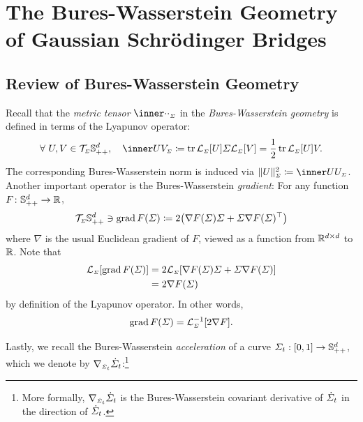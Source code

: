\section{The Bures-Wasserstein Geometry of Gaussian Schr\"odinger Bridges}
\label{app:mechanics}

\subsection{Review of Bures-Wasserstein Geometry}

\label{app:reviewBW}

Recall that the \emph{metric tensor} $\innerBW[\cdot][\cdot][\Sigma]$ in the \emph{Bures-Wasserstein geometry} \citep{takatsu2010wasserstein} is defined in terms of the Lyapunov operator: 
\begin{align}
\label{eq:BW-tensor}
\forall\ U, V\in \tspace, \quad \innerBW[U][V][\Sigma] \defeq \tr\lyap[\Sigma][U]\Sigma\lyap[\Sigma][V] = \frac{1}{2}\tr \lyap[\Sigma][U]V.
\end{align}The corresponding Bures-Wasserstein norm is induced via $\normBWsq[U][\Sigma] \defeq \innerBW[U][U][\Sigma]$.
Another important operator is the Bures-Wasserstein \emph{gradient}: For any function $F \colon \mathbb{S}_{++}^d \to \mathbb{R}$, 
\begin{equation}
\label{eq:gradBW-def}
\tspace\ni \gradBW F(\Sigma) \defeq 2 \parens*{ \nabla F(\Sigma)\Sigma + \Sigma \nabla F(\Sigma)^\top }
\end{equation}where $\nabla$ is the usual Euclidean gradient of $F$, viewed as a function from $\mathbb{R}^{d\times d}$ to $\mathbb{R}$. Note that
\begin{align}
\lyap[\Sigma][\gradBW F(\Sigma)] &= 2 \lyap[\Sigma][\nabla F(\Sigma)\Sigma + \Sigma\nabla F(\Sigma)] \\
&= 2 \nabla F(\Sigma)
\end{align}by definition of the Lyapunov operator. In other words,
\begin{align}
\label{eq:gradBW-lyapinv}
\gradBW F(\Sigma) = \lyapinv.
\end{align}


Lastly, we recall the Bures-Wasserstein \emph{acceleration} of a curve $\Sigma_{t}: [0,1] \to \mathbb{S}_{++}^d$, which we denote by $\nabla_{\scriptscriptstyle\dot{\Sigma}_{t}}\dot{\Sigma}_{t}$:\footnote{More formally, $\nabla_{\scriptscriptstyle\dot{\Sigma}_{t}}\dot{\Sigma}_{t}$ is the Bures-Wasserstein covariant derivative of $\dot{\Sigma}_{t}$ in the direction of $\dot{\Sigma}_{t}$.}

